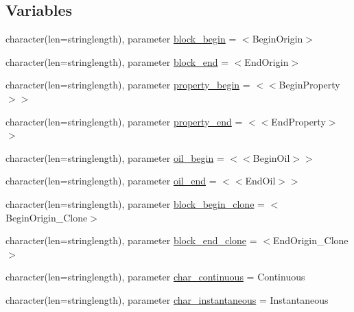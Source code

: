\subsection*{Variables}
\begin{DoxyCompactItemize}
\item 
character(len=stringlength), parameter \mbox{\hyperlink{namespacemodulelagrangian_a3b2b97e0ca43dc95463c7c495dba5bbc}{block\+\_\+begin}} = \textquotesingle{}$<$Begin\+Origin$>$\textquotesingle{}
\item 
character(len=stringlength), parameter \mbox{\hyperlink{namespacemodulelagrangian_ac7dbdc0afd31f49c859b3f60122dd029}{block\+\_\+end}} = \textquotesingle{}$<$End\+Origin$>$\textquotesingle{}
\item 
character(len=stringlength), parameter \mbox{\hyperlink{namespacemodulelagrangian_ac725232043bb1c31fa21e57ed72c4949}{property\+\_\+begin}} = \textquotesingle{}$<$$<$Begin\+Property$>$$>$\textquotesingle{}
\item 
character(len=stringlength), parameter \mbox{\hyperlink{namespacemodulelagrangian_ac4553a88c5f02b9c1d41a6579d59eb3a}{property\+\_\+end}} = \textquotesingle{}$<$$<$End\+Property$>$$>$\textquotesingle{}
\item 
character(len=stringlength), parameter \mbox{\hyperlink{namespacemodulelagrangian_a76e98eb6095cdfb93d04d92fb037928f}{oil\+\_\+begin}} = \textquotesingle{}$<$$<$Begin\+Oil$>$$>$\textquotesingle{}
\item 
character(len=stringlength), parameter \mbox{\hyperlink{namespacemodulelagrangian_aba7b7a58cc57d4825f1e6c07f448a8b0}{oil\+\_\+end}} = \textquotesingle{}$<$$<$End\+Oil$>$$>$\textquotesingle{}
\item 
character(len=stringlength), parameter \mbox{\hyperlink{namespacemodulelagrangian_a63c4b724f3174887fab565a1d41c783d}{block\+\_\+begin\+\_\+clone}} = \textquotesingle{}$<$Begin\+Origin\+\_\+\+Clone$>$\textquotesingle{}
\item 
character(len=stringlength), parameter \mbox{\hyperlink{namespacemodulelagrangian_aa39d97711af9effc178ac42915d081f9}{block\+\_\+end\+\_\+clone}} = \textquotesingle{}$<$End\+Origin\+\_\+\+Clone$>$\textquotesingle{}
\item 
character(len=stringlength), parameter \mbox{\hyperlink{namespacemodulelagrangian_ae77cee5914a2507aed736ffd525ac90d}{char\+\_\+continuous}} = \textquotesingle{}Continuous\textquotesingle{}
\item 
character(len=stringlength), parameter \mbox{\hyperlink{namespacemodulelagrangian_a782c8241c87e133fded7322d77fb377d}{char\+\_\+instantaneous}} = \textquotesingle{}Instantaneous\textquotesingle{}

\end{DoxyCompactItemize}

